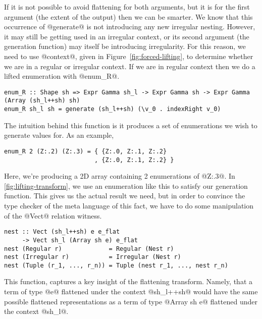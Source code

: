 If it is not possible to avoid flattening for both arguments, but it is for the first argument (the extent of the output) then we can be smarter. We know that this occurrence of @generate@ is not introducing any new irregular nesting. However, it may still be getting used in an irregular context, or its second argument (the generation function) may itself be introducing irregularity. For this reason, we need to use @context@, given in Figure~\ref{fig:forced-lifting}, to determine whether we are in a regular or irregular context. If we are in regular context then we do a lifted enumeration with @enum_R@.
%
\begin{lstlisting}[style=ndp]
enum_R :: Shape sh => Expr Gamma sh_l -> Expr Gamma sh -> Expr Gamma (Array (sh_l++sh) sh)
enum_R sh_l sh = generate (sh_l++sh) (\v_0 . indexRight v_0)
\end{lstlisting}
%
The intuition behind this function is it produces a set of enumerations we wish to generate values for. As an example,
%
\begin{lstlisting}[style=ndp]
enum_R 2 (Z:.2) (Z:.3) = { {Z:.0, Z:.1, Z:.2}
                         , {Z:.0, Z:.1, Z:.2} }
\end{lstlisting}
%
Here, we're producing a 2D array containing 2 enumerations of @Z:.3@. In \ref{fig:lifting-transform}, we use an enumeration like this to satisfy our generation function. This gives us the actual result we need, but in order to convince the type checker of the meta language of this fact, we have to do some manipulation of the @Vect@ relation witness.
%
\begin{lstlisting}[style=ndp]
nest :: Vect (sh_l++sh) e e_flat
     -> Vect sh_l (Array sh e) e_flat
nest (Regular r)             = Regular (Nest r)
nest (Irregular r)           = Irregular (Nest r)
nest (Tuple (r_1, ..., r_n)) = Tuple (nest r_1, ..., nest r_n)
\end{lstlisting}
%
This function, captures a key insight of the flattening transform. Namely, that a term of type @e@ flattened under the context @sh_l++sh@ would have the same possible flattened representations as a term of type @Array sh e@ flattened under the context @sh_l@.

